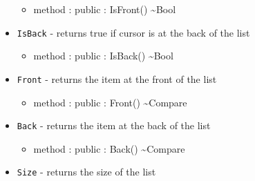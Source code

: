 \documentclass[11pt]{article}
\begin{document}
\begin{itemize}
  \begin{itemize}
  \item method : public : IsFront() \textasciitilde Bool
  \end{itemize}
\item \texttt{IsBack} - returns true if cursor is at the back of the
  list
  \begin{itemize}
  \item method : public : IsBack() \textasciitilde Bool
  \end{itemize}
\item \texttt{Front} - returns the item at the front of the list
  \begin{itemize}
  \item method : public : Front() \textasciitilde Compare
  \end{itemize}
\item \texttt{Back} - returns the item at the back of the list
  \begin{itemize}
  \item method : public : Back() \textasciitilde Compare
  \end{itemize}
\item \texttt{Size} - returns the size of the list
\end{itemize}
\end{document}
